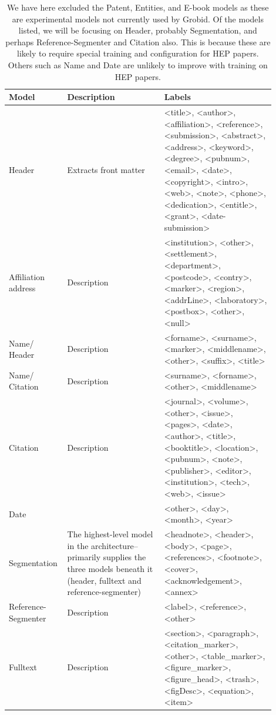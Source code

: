 \begin{center}
\begin{table}
\begin{tabular}{ | p{0.15\linewidth} | p{0.35\linewidth} | p{0.4\linewidth} |}
	\hline
	Model & Description & Labels \\ \hline
    Header & Extracts front matter & <title>, <author>, <affiliation>, <reference>, <submission>, <abstract>, <address>, <keyword>, <degree>, <pubnum>, <email>, <date>, <copyright>, <intro>, <web>, <note>, <phone>, <dedication>, <entitle>, <grant>, <date-submission> \\ \hline
	Affiliation address & Description & <institution>, <other>, <settlement>, <department>, <postcode>, <contry>, <marker>, <region>, <addrLine>, <laboratory>, <postbox>, <other>, <null> \\ \hline
	Name/ Header & Description & <forname>, <surname>, <marker>, <middlename>, <other>, <suffix>, <title> \\ \hline
	Name/ Citation & Description & <surname>, <forname>, <other>, <middlename> \\ \hline
	Citation & Description & <journal>, <volume>, <other>, <issue>, <pages>, <date>, <author>, <title>, <booktitle>, <location>, <pubnum>, <note>, <publisher>, <editor>, <institution>, <tech>, <web>, <issue> \\ \hline
	Date & & <other>, <day>, <month>, <year> \\ \hline
	Segmentation & The highest-level model in the architecture--primarily supplies the three models beneath it (header, fulltext and reference-segmenter) & <headnote>, <header>, <body>, <page>, <references>, <footnote>, <cover>, <acknowledgement>, <annex> \\ \hline
	Reference-Segmenter & Description & <label>, <reference>, <other> \\ \hline
	Fulltext & Description & <section>, <paragraph>, <citation\_marker>, <other>, <table\_marker>, <figure\_marker>, <figure\_head>, <trash>, <figDesc>, <equation>, <item> \\ \hline
\end{tabular}
\caption{We have here excluded the Patent, Entities, and E-book models as these are experimental models not currently used by Grobid. Of the models listed, we will be focusing on Header, probably Segmentation, and perhaps Reference-Segmenter and Citation also. This is because these are likely to require special training and configuration for HEP papers. Others such as Name and Date are unlikely to improve with training on HEP papers.}
\label{fig:featurelist}
\end{table}
\end{center}

